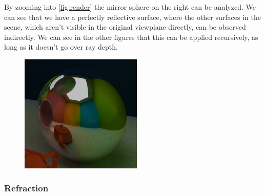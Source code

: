 \documentclass[a4paper, twocolumn]{article}
\begin{document}
            By zooming into \cref{fig:render} the mirror sphere on the right can be analyzed. We can see that we have a perfectly reflective surface, where the other surfaces in the scene, which aren't visible in the original viewplane directly, can be observed indirectly. We can see in the other figures that this can be applied recursively, as long as it doesn't go over ray depth.

            \begin{figure}[H]
                \centering
                \includegraphics[width=0.8\linewidth]{share/new_render_reflection.png}
                \label{fig:render_reflection}
            \end{figure}

            \subsubsection*{Refraction}
\end{document}
